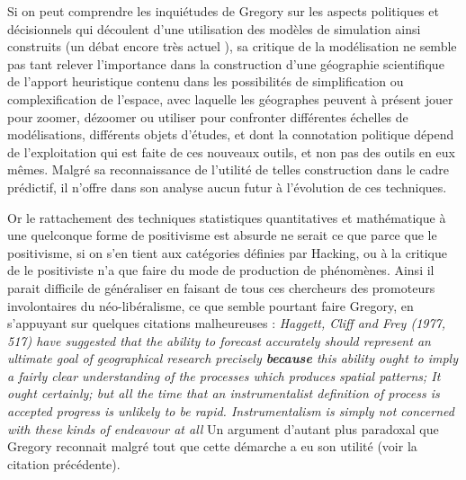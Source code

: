Si on peut comprendre les inquiétudes de Gregory \textcite{Gregory1978} sur les aspects politiques et décisionnels qui découlent d'une utilisation des modèles de simulation ainsi construits (un débat encore très actuel \autocite{OSullivan2004} ), sa critique de la modélisation ne semble pas tant relever l'importance dans la construction d'une géographie scientifique de l'apport heuristique contenu dans les possibilités de simplification ou complexification de l'espace, avec laquelle les géographes peuvent à présent jouer pour zoomer, dézoomer ou utiliser pour confronter différentes échelles de modélisations, différents objets d'études, et dont la connotation politique dépend de l'exploitation qui est faite de ces nouveaux outils, et non pas des outils en eux mêmes. Malgré sa reconnaissance de l'utilité de telles construction dans le cadre prédictif, il n'offre dans son analyse aucun futur à l'évolution de ces techniques.

Or le rattachement des techniques statistiques quantitatives et mathématique à une quelconque forme de positivisme est absurde ne serait ce que parce que le positivisme, si on s'en tient aux catégories définies par Hacking, ou à la critique de \autocite{Dauphine2003} le positiviste n'a que faire du mode de production de phénomènes. Ainsi il parait difficile de généraliser en faisant de tous ces chercheurs des promoteurs involontaires du néo-libéralisme, ce que semble pourtant faire Gregory, en s'appuyant sur quelques citations malheureuses : \textit{Haggett, Cliff and Frey (1977, 517) have suggested that \textit{the ability to forecast accurately should represent an ultimate goal of geographical research} precisely \textbf{because} \textit{this ability ought to imply a fairly clear understanding of the processes which produces spatial patterns}; It ought certainly; but all the time that an instrumentalist definition of process is accepted progress is unlikely to be rapid. Instrumentalism is simply not concerned with these kinds of endeavour at all} \autocite[41]{Gregory1978} Un argument d'autant plus paradoxal que Gregory reconnait malgré tout que cette démarche a eu son utilité (voir la citation précédente).

